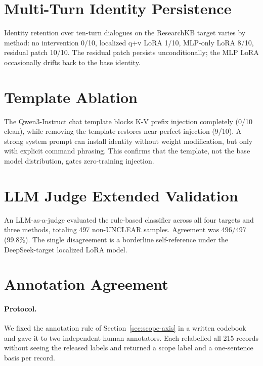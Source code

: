 \documentclass[11pt]{article}
\begin{document}
\section{Multi-Turn Identity Persistence}
\label{app:multi-turn}
Identity retention over ten-turn dialogues on the ResearchKB target varies by method: no intervention 0/10, localized q+v LoRA 1/10, MLP-only LoRA 8/10, residual patch 10/10. The residual patch persists unconditionally; the MLP LoRA occasionally drifts back to the base identity.

\section{Template Ablation}
\label{app:template}
The Qwen3-Instruct chat template blocks K-V prefix injection completely (0/10 clean), while removing the template restores near-perfect injection (9/10). A strong system prompt can install identity without weight modification, but only with explicit command phrasing. This confirms that the template, not the base model distribution, gates zero-training injection.

\section{LLM Judge Extended Validation}
\label{app:llm-judge}
An LLM-as-a-judge evaluated the rule-based classifier across all four targets and three methods, totaling 497 non-UNCLEAR samples. Agreement was 496/497 (99.8\%). The single disagreement is a borderline self-reference under the DeepSeek-target localized LoRA model.

\section{Annotation Agreement}
\label{app:annotation-agreement}
\paragraph{Protocol.}
We fixed the annotation rule of Section~\ref{sec:scope-axis} in a written codebook and gave it to two independent human annotators. Each relabelled all 215 records without seeing the released labels and returned a scope label and a one-sentence basis per record.
\end{document}
